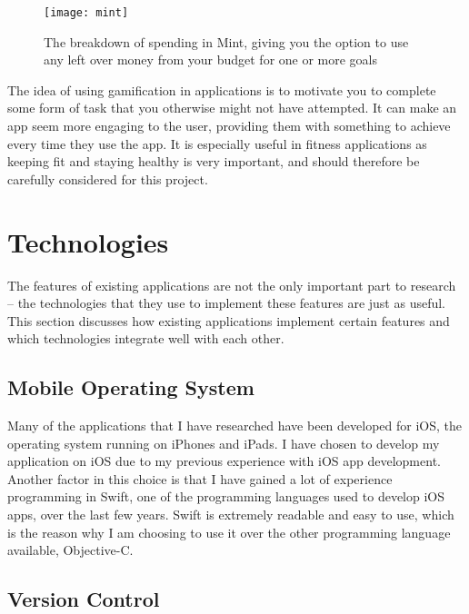 \begin{figure}[hbt]
  \centering
  \texttt{[image: mint]}
  \caption{The breakdown of spending in Mint, giving you the option to use any left over money from your budget for one or more goals \cite{IntuitInc.a}}
  \label{fig:mint}
\end{figure}

The idea of using gamification in applications is to motivate you to complete some form of task that you otherwise might not have attempted. It can make an app seem more engaging to the user, providing them with something to achieve every time they use the app. It is especially useful in fitness applications as keeping fit and staying healthy is very important, and should therefore be carefully considered for this project.


\section{Technologies}

The features of existing applications are not the only important part to research -- the technologies that they use to implement these features are just as useful. This section discusses how existing applications implement certain features and which technologies integrate well with each other.

\subsection{Mobile Operating System}

Many of the applications that I have researched have been developed for iOS, the operating system running on iPhones and iPads. I have chosen to develop my application on iOS due to my previous experience with iOS app development. Another factor in this choice is that I have gained a lot of experience programming in Swift, one of the programming languages used to develop iOS apps, over the last few years. Swift is extremely readable and easy to use, which is the reason why I am choosing to use it over the other programming language available, Objective-C.

\subsection{Version Control}

